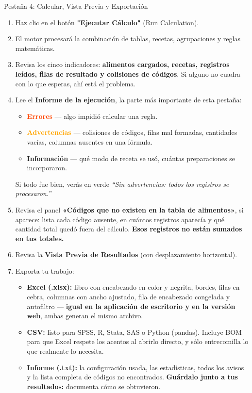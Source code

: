 \documentclass[11pt,a4paper]{article}
\begin{document}
\vspace{0.4cm}

\begin{stepcard}{Pestaña 4: Calcular, Vista Previa y Exportación}
\begin{enumerate}[leftmargin=*]
    \item Haz clic en el botón \textbf{"Ejecutar Cálculo"} (Run Calculation).
    \item El motor procesará la combinación de tablas, recetas, agrupaciones y reglas matemáticas.
    \item Revisa los cinco indicadores: \textbf{alimentos cargados, recetas, registros leídos, filas de resultado y colisiones de códigos}. Si alguno no cuadra con lo que esperas, ahí está el problema.
    \item Lee el \textbf{Informe de la ejecución}, la parte más importante de esta pestaña:
    \begin{itemize}
        \item \textcolor{OrangeRed}{\textbf{Errores}} --- algo impidió calcular una regla.
        \item \textcolor{orange}{\textbf{Advertencias}} --- colisiones de códigos, filas mal formadas, cantidades vacías, columnas ausentes en una fórmula.
        \item \textcolor{aeroemerald}{\textbf{Información}} --- qué modo de receta se usó, cuántas preparaciones se incorporaron.
    \end{itemize}
    Si todo fue bien, verás en verde \textit{``Sin advertencias: todos los registros se procesaron.''}
    \item Revisa el panel \textbf{«Códigos que no existen en la tabla de alimentos»}, si aparece: lista cada código ausente, en cuántos registros aparecía y qué cantidad total quedó fuera del cálculo. \textbf{Esos registros no están sumados en tus totales.}
    \item Revisa la \textbf{Vista Previa de Resultados} (con desplazamiento horizontal).
    \item Exporta tu trabajo:
    \begin{itemize}[label=\textcolor{aeroemerald}{$\rightarrow$}]
        \item \textbf{Excel (.xlsx):} libro con encabezado en color y negrita, bordes, filas en cebra, columnas con ancho ajustado, fila de encabezado congelada y autofiltro --- \textbf{igual en la aplicación de escritorio y en la versión web}, ambas generan el mismo archivo.
        \item \textbf{CSV:} listo para SPSS, R, Stata, SAS o Python (pandas). Incluye BOM para que Excel respete los acentos al abrirlo directo, y sólo entrecomilla lo que realmente lo necesita.
        \item \textbf{Informe (.txt):} la configuración usada, las estadísticas, todos los avisos y la lista completa de códigos no encontrados. \textbf{Guárdalo junto a tus resultados:} documenta cómo se obtuvieron.
    \end{itemize}
\end{enumerate}


\end{stepcard}
\end{document}
